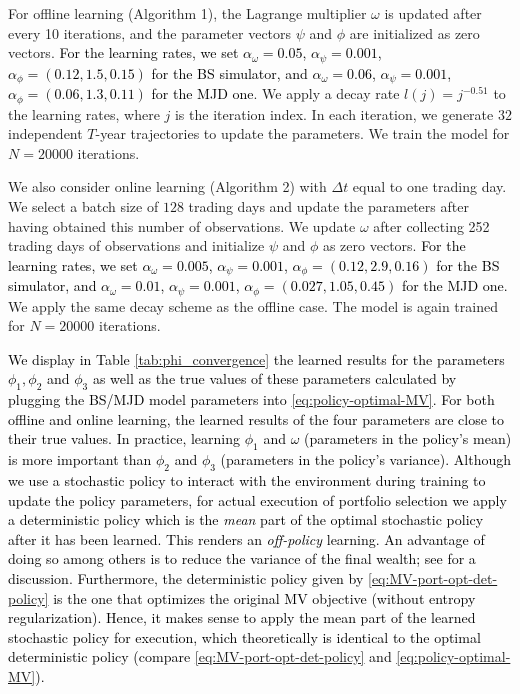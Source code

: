 \documentclass[11pt]{article}
\newcommand{\1}{\mathbbm{1}}
\newcommand{\rev}[1]{\textcolor{black}{{#1}}} %
\begin{document}
For offline learning (Algorithm 1), the Lagrange multiplier $\omega$ is updated after every 10 iterations, and the parameter vectors $\psi$ and $\phi$ are initialized as zero vectors. \rev{For the learning rates, we set $\alpha_\omega=0.05$, $\alpha_\psi=0.001$, $\alpha_\phi=(0.12,1.5,0.15)$ for the BS simulator, and $\alpha_\omega=0.06$, $\alpha_\psi=0.001$, $\alpha_\phi=(0.06,1.3,0.11)$ for the MJD one}. We apply a decay rate $l(j)=j^{-0.51}$ to the learning rates, where $j$ is the iteration index. In each iteration, we generate $32$ independent $T$-year trajectories to update the parameters. We train the model for $N=20000$ iterations.

We also consider online learning (Algorithm 2) with $\Delta t$ equal to one trading day. We select a batch size of $128$ trading days and update the parameters after having obtained this number of observations. We update $\omega$ after collecting 252 trading days of observations and initialize $\psi$ and $\phi$ as zero vectors. \rev{For the learning rates, we set $\alpha_\omega=0.005$, $\alpha_\psi=0.001$, $\alpha_\phi=(0.12,2.9,0.16)$ for the BS simulator, and $\alpha_\omega=0.01$, $\alpha_\psi=0.001$, $\alpha_\phi=(0.027,1.05,0.45)$ for the MJD one.} We apply the same decay scheme as the offline case. The model is again trained for $N=20000$ iterations.




\rev{We display in Table \ref{tab:phi_convergence} the learned results for the parameters $\phi_1,\phi_2$ and $\phi_3$ as well as the true values of these parameters calculated by plugging the BS/MJD model parameters into \eqref{eq:policy-optimal-MV}. For both offline and online learning, the learned results of the four parameters are close to their true values. In practice, learning $\phi_1$ and $\omega$ (parameters in the policy's mean) is more important than $\phi_2$ and $\phi_3$ (parameters in the policy's variance). Although we use a stochastic policy to interact with the environment during training to update the policy parameters, for actual execution of portfolio selection we apply a deterministic policy which is the \emph{mean} part of the optimal stochastic policy after it has been learned. This renders an  {\it off-policy} learning. An advantage of doing so among others is to reduce the variance of the final wealth; see \cite{huang2022achieving} for a discussion. Furthermore, the deterministic policy given by \eqref{eq:MV-port-opt-det-policy} is the one that optimizes the original MV objective (without entropy regularization). Hence, it makes sense to apply the mean part of the learned stochastic policy for execution, which theoretically is identical to the optimal deterministic policy (compare \eqref{eq:MV-port-opt-det-policy} and \eqref{eq:policy-optimal-MV}). }
\end{document}
